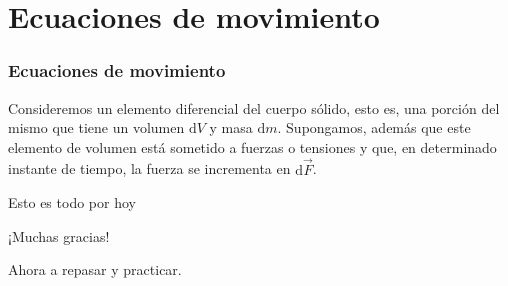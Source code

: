 \documentclass[11pt,handout,aspectratio=1610]{beamer}
\newcommand{\diff}[0]{\text{d}}
\newcommand{\vs}{\vspace{11pt}}
\begin{document}
\section{Ecuaciones de movimiento}

\begin{frame}
    \frametitle{Ecuaciones de movimiento}

    Consideremos un elemento diferencial del cuerpo sólido, esto es, una porción del mismo que tiene un volumen $\diff V$ y masa $\diff m$. Supongamos, además que este elemento de volumen está sometido a fuerzas o tensiones y que, en determinado instante de tiempo, la fuerza se incrementa en $\diff \vec{F}$. 

\end{frame}

\begin{frame}{Esto es todo por hoy}

    \begin{center}
        {\huge ¡Muchas gracias!}

        \vs

        Ahora a repasar y practicar.
    \end{center}

\end{frame}
\end{document}
